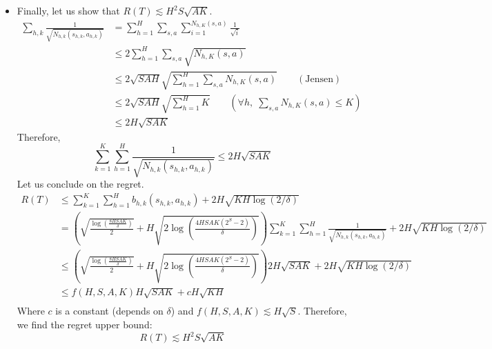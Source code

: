 \documentclass[a4paper]{article}
\begin{document}
\begin{itemize}
	
	\item Finally, let us show that $R(T) \lesssim H^2S\sqrt{AK}$.
	\begin{align*}
		\sum_{h,k} \frac{1}{\sqrt{N_{h,k}(s_{h,k},a_{h,k})}} &= \sum_{h=1}^H\sum_{s,a} \sum_{i=1}^{N_{h,K}(s,a)} \frac{1}{\sqrt{i}} \\
		&\leq 2\sum_{h=1}^H\sum_{s,a} \sqrt{N_{h,K}(s,a)} \\
		&\leq 2\sqrt{SAH}\sqrt{\sum_{h=1}^H\sum_{s,a} N_{h,K}(s,a)} \qquad \left(\text{Jensen}\right)\\
		&\leq 2\sqrt{SAH}\sqrt{\sum_{h=1}^H K} \qquad \left(\forall h, \; \sum_{s,a} N_{h,K}(s,a) \leq K \right) \\
		&\leq 2H\sqrt{SAK}
	\end{align*}
	Therefore, 
	\[
	\boxed{\sum_{k=1}^{K} \sum_{h=1}^H \frac{1}{\sqrt{N_{h,k}(s_{h,k},a_{h,k})}} \leq 2H\sqrt{SAK}}
	\]
	Let us conclude on the regret.
	\begin{align*}
		R(T) &\leq \sum_{k=1}^{K} \sum_{h=1}^H b_{h,k}(s_{h,k},a_{h,k}) + 2H\sqrt{KH \log(2/\delta)} \\
		&= \left( \sqrt{\frac{\log \left(\frac{8HSAK}{\delta}\right)}{2}} + H\sqrt{2\log \left(\frac{4HSAK\left(2^S-2\right)}{\delta}\right)} \right) \sum_{k=1}^{K} \sum_{h=1}^H \frac{1}{\sqrt{N_{h,k}(s_{h,k},a_{h,k})}} + 2H\sqrt{KH \log(2/\delta)} \\
		&\leq \left( \sqrt{\frac{\log \left(\frac{8HSAK}{\delta}\right)}{2}} + H\sqrt{2\log \left(\frac{4HSAK\left(2^S-2\right)}{\delta}\right)} \right) 2H\sqrt{SAK}  + 2H\sqrt{KH \log(2/\delta)}\\
		&\leq f\left(H,S,A,K\right) H\sqrt{SAK} + cH\sqrt{KH} \\
	\end{align*}
	Where $c$ is a constant (depends on $\delta$) and $f\left(H,S,A,K\right) \lesssim H\sqrt{S}$.
	Therefore, we find the regret upper bound:
	\[
	\boxed{R(T) \lesssim H^2S\sqrt{AK}}
	\]
\end{itemize}
\end{document}
